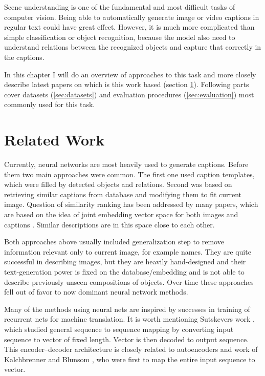 Scene understanding is one of the fundamental and most difficult tasks of computer vision. Being able to automatically generate image or video captions in regular text could have great effect. However, it is much more complicated than simple classification or object recognition, because the model also need to understand relations between the recognized objects and capture that correctly in the captions.

In this chapter I will do an overview of approaches to this task and more closely describe latest papers on which is this work based (section \ref{sec:related}). Following parts cover datasets (\ref{sec:datasets}) and evaluation procedures (\ref{sec:evaluation}) most commonly used for this task.

	\section{Related Work}
	\label{sec:related}
	
Currently, neural networks are most heavily used to generate captions. Before them two main approaches were common. The first one used caption templates, which were filled by detected objects and relations. Second was based on retrieving similar captions from database and modifying them to fit current image. Question of similarity ranking has been addressed by many papers, which are based on the idea of joint embedding vector space for both images and captions \cite{DBLP:journals/corr/KarpathyF14}. Similar descriptions are in this space close to each other.

Both approaches above usually included generalization step to remove information relevant only to current image, for example names. They are quite successful in describing images, but they are heavily hand-designed and their text-generation power is fixed on the database/embedding and is not able to describe previously unseen compositions of objects. Over time these approaches fell out of favor to now dominant neural network methods.

Many of the methods using neural nets are inspired by successes in training of recurrent nets for machine translation. It is worth mentioning Sutskevers work \cite{DBLP:journals/corr/SutskeverVL14}, which studied general sequence to sequence mapping by converting input sequence to vector of fixed length. Vector is then decoded to output sequence. This encoder--decoder architecture is closely related to autoencoders and work of Kalchbrenner and Blunsom \cite{conf/emnlp/KalchbrennerB13}, who were first to map the entire input sequence to vector.


